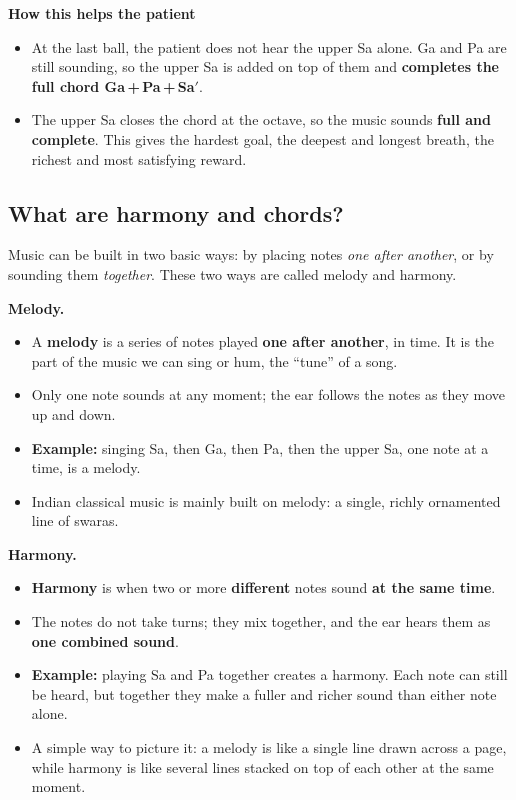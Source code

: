 \documentclass[12pt,a4paper]{article}
\newcommand{\Sah}{Sa\ensuremath{'}}     %
\begin{document}
\textbf{How this helps the patient}
\begin{itemize}
  \item At the last ball, the patient does not hear the upper Sa alone. Ga and Pa are still sounding, so the upper Sa is added on top of them and \textbf{completes the full chord Ga\,+\,Pa\,+\,\Sah}.
  \item The upper Sa closes the chord at the octave, so the music sounds \textbf{full and complete}. This gives the hardest goal, the deepest and longest breath, the richest and most satisfying reward.
\end{itemize}

\subsection{What are harmony and chords?}
\label{sec:harmony}

Music can be built in two basic ways: by placing notes \emph{one after another}, or by sounding them \emph{together}. These two ways are called melody and harmony.

\textbf{Melody.}
\begin{itemize}
  \item A \textbf{melody} is a series of notes played \textbf{one after another}, in time. It is the part of the music we can sing or hum, the ``tune'' of a song.
  \item Only one note sounds at any moment; the ear follows the notes as they move up and down.
  \item \textbf{Example:} singing Sa, then Ga, then Pa, then the upper Sa, one note at a time, is a melody.
  \item Indian classical music is mainly built on melody: a single, richly ornamented line of swaras.
\end{itemize}

\textbf{Harmony.}
\begin{itemize}
  \item \textbf{Harmony} is when two or more \textbf{different} notes sound \textbf{at the same time}.
  \item The notes do not take turns; they mix together, and the ear hears them as \textbf{one combined sound}.
  \item \textbf{Example:} playing Sa and Pa together creates a harmony. Each note can still be heard, but together they make a fuller and richer sound than either note alone.
  \item A simple way to picture it: a melody is like a single line drawn across a page, while harmony is like several lines stacked on top of each other at the same moment.
\end{itemize}
\end{document}
